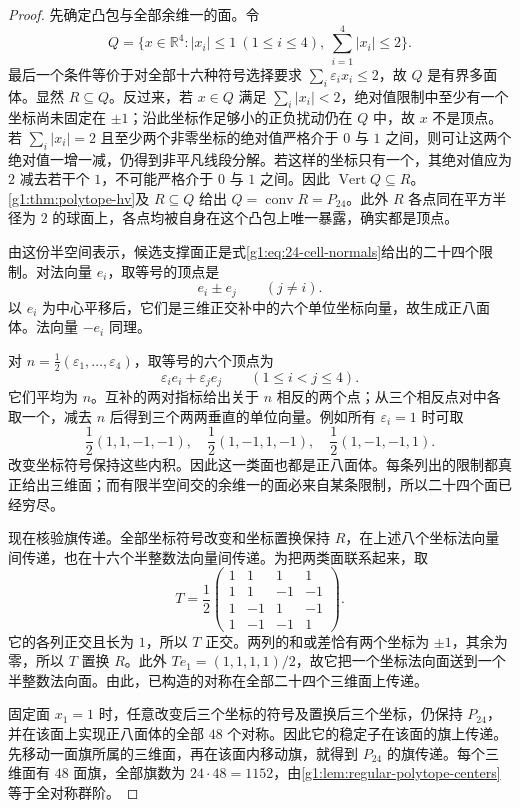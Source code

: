 \begin{proof}
	先确定凸包与全部余维一的面。令
	\[
		Q=\{x\in\mathbb R^4:|x_i|\le1\ (1\le i\le4),\ 
		\sum_{i=1}^4|x_i|\le2\}.
	\]
	最后一个条件等价于对全部十六种符号选择要求 \(\sum_i\varepsilon_ix_i\le2\)，故 \(Q\) 是有界多面体。显然 \(R\subseteq Q\)。反过来，若 \(x\in Q\) 满足 \(\sum_i|x_i|<2\)，绝对值限制中至少有一个坐标尚未固定在 \(\pm1\)；沿此坐标作足够小的正负扰动仍在 \(Q\) 中，故 \(x\) 不是顶点。若 \(\sum_i|x_i|=2\) 且至少两个非零坐标的绝对值严格介于 \(0\) 与 \(1\) 之间，则可让这两个绝对值一增一减，仍得到非平凡线段分解。若这样的坐标只有一个，其绝对值应为 \(2\) 减去若干个 \(1\)，不可能严格介于 \(0\) 与 \(1\) 之间。因此 \(\operatorname{Vert}Q\subseteq R\)。\cref{g1:thm:polytope-hv}及 \(R\subseteq Q\) 给出 \(Q=\operatorname{conv}R=P_{24}\)。此外 \(R\) 各点同在平方半径为 \(2\) 的球面上，各点均被自身在这个凸包上唯一暴露，确实都是顶点。

	由这份半空间表示，候选支撑面正是式\eqref{g1:eq:24-cell-normals}给出的二十四个限制。对法向量 \(e_i\)，取等号的顶点是
	\[
		e_i\pm e_j\qquad(j\ne i).
	\]
	以 \(e_i\) 为中心平移后，它们是三维正交补中的六个单位坐标向量，故生成正八面体。法向量 \(-e_i\) 同理。

	对 \(n=\tfrac12(\varepsilon_1,\ldots,\varepsilon_4)\)，取等号的六个顶点为
	\[
		\varepsilon_ie_i+\varepsilon_je_j\qquad(1\le i<j\le4).
	\]
	它们平均为 \(n\)。互补的两对指标给出关于 \(n\) 相反的两个点；从三个相反点对中各取一个，减去 \(n\) 后得到三个两两垂直的单位向量。例如所有 \(\varepsilon_i=1\) 时可取
	\[
		\frac12(1,1,-1,-1),\quad
		\frac12(1,-1,1,-1),\quad
		\frac12(1,-1,-1,1).
	\]
	改变坐标符号保持这些内积。因此这一类面也都是正八面体。每条列出的限制都真正给出三维面；而有限半空间交的余维一的面必来自某条限制，所以二十四个面已经穷尽。

	现在核验旗传递。全部坐标符号改变和坐标置换保持 \(R\)，在上述八个坐标法向量间传递，也在十六个半整数法向量间传递。为把两类面联系起来，取
	\[
		T=\frac12
		\begin{pmatrix}
			1&1&1&1\\
			1&1&-1&-1\\
			1&-1&1&-1\\
			1&-1&-1&1
		\end{pmatrix}.
	\]
	它的各列正交且长为 \(1\)，所以 \(T\) 正交。两列的和或差恰有两个坐标为 \(\pm1\)，其余为零，所以 \(T\) 置换 \(R\)。此外 \(Te_1=(1,1,1,1)/2\)，故它把一个坐标法向面送到一个半整数法向面。由此，已构造的对称在全部二十四个三维面上传递。

	固定面 \(x_1=1\) 时，任意改变后三个坐标的符号及置换后三个坐标，仍保持 \(P_{24}\)，并在该面上实现正八面体的全部 \(48\) 个对称。因此它的稳定子在该面的旗上传递。先移动一面旗所属的三维面，再在该面内移动旗，就得到 \(P_{24}\) 的旗传递。每个三维面有 \(48\) 面旗，全部旗数为 \(24\cdot48=1152\)，由\cref{g1:lem:regular-polytope-centers}等于全对称群阶。


\end{proof}
